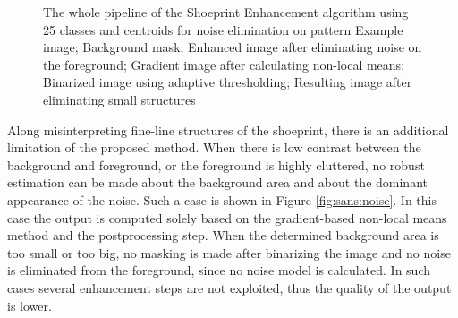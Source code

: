 \documentclass[draft,final]{vutinfth} %
\begin{document}
{\begin{figure}[H]

\caption{The whole pipeline of the Shoeprint Enhancement algorithm using 25 classes and centroids for noise elimination on pattern
				 Example image;  Background mask;  Enhanced image after eliminating noise on the foreground;  Gradient image after calculating non-local means;   Binarized image using adaptive thresholding;  Resulting image after eliminating small structures}
\label{fig:sans:pip}

\end{figure}
}

\par
Along misinterpreting fine-line structures of the shoeprint, there is an additional limitation of the proposed method.
When there is low contrast between the background and foreground, or the foreground is highly cluttered, no robust estimation can be made about the background area and about the dominant appearance of the noise. 
Such a case is shown in Figure \ref{fig:sans:noise}.
In this case the output is computed solely based on the gradient-based non-local means method and the postprocessing step.
When the determined background area is too small or too big, no masking is made after binarizing the image and no noise is eliminated from the foreground, since no noise model is calculated.
In such cases several enhancement steps are not exploited, thus the quality of the output is lower. 
\end{document}
